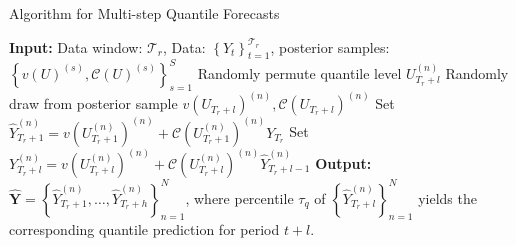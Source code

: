 \begin{algorithm}[H] 
\caption{Algorithm for Multi-step Quantile Forecasts} \label{algorithm:forecasts}
\begin{algorithmic}[1]
\State \textbf{Input:} Data window: $\mathcal{T}_r$,  Data: $\left\{Y_t \right\}^{\mathcal{T}_{r }}_{t=1}$, posterior samples: $\left\{v(U)^{(s)}, \mathcal{C}(U)^{(s)}  \right\}_{s=1}^S$
    \State Randomly permute quantile level $U_{T_r+l}^{(n)}$ 
    \State Randomly draw from posterior sample $v(U_{T_r+l})^{(n)}, \mathcal{C}(U_{T_r+l})^{(n)}$
        \State Set $\hat{Y}_{T_r+1}^{(n)} = v(U_{T_r+1}^{(n)})^{(n)} + \mathcal{C}(U_{T_r+1}^{(n)})^{(n)} Y_{T_r}$
    \Else
        \State Set $Y_{T_r+l}^{(n)} = v(U_{T_r+l}^{(n)})^{(n)} + \mathcal{C}(U_{T_r+l}^{(n)})^{(n)} \hat{Y}_{T_r+l-1}^{(n)}$
    \EndIf
    \EndFor
\EndFor
\State \textbf{Output:} $ \boldsymbol{\hat{Y}} = \left\{\hat{Y}_{T_r+1}^{(n)},\dotsc, \hat{Y}_{T_r+h}^{(n)} \right\}_{n=1}^N$, where percentile $\tau_q$ of $\left\{ \hat{Y}^{(n)}_{T_r+l}\right\}_{n=1}^N$ yields the corresponding quantile prediction for period $t+l$.
\end{algorithmic}
\end{algorithm}
%
